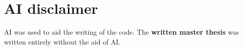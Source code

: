 \chapter*{AI disclaimer}
    AI was used to aid the writing of the code. The \textbf{written master thesis} was written entirely without the aid of AI.
